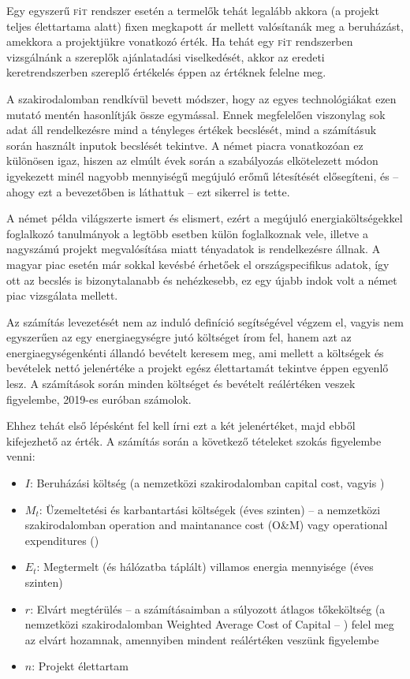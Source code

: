 \documentclass[twoside, magyar, showtrims]{corvinusphd}
\theoremstyle{plain}
\theoremstyle{remark}
\theoremstyle{definition}
\newcommand{\fit}{\textsc{f}i\textsc{t}\index{\textsc{f}i\textsc{t}} }
\begin{document}
Egy egyszerű \fit rendszer esetén a termelők tehát legalább akkora
(a projekt teljes élettartama alatt) fixen megkapott ár
mellett valósítanák meg a beruházást,
amekkora a projektjükre vonatkozó  érték.
Ha tehát egy \fit rendszerben vizsgálnánk
a szereplők ajánlatadási viselkedését,
akkor az eredeti keretrendszerben szereplő értékelés
éppen az  értéknek felelne meg.

A szakirodalomban rendkívül bevett módszer,
hogy az egyes technológiákat
ezen mutató mentén hasonlítják össze egymással.
Ennek megfelelően
viszonylag sok adat áll rendelkezésre mind a tényleges  értékek becslését,
mind a számításuk során használt inputok becslését tekintve.
A német piacra vonatkozóan ez különösen igaz,
hiszen az elmúlt évek során
a szabályozás elkötelezett módon igyekezett minél nagyobb
mennyiségű megújuló erőmű létesítését elősegíteni,
és -- ahogy ezt a bevezetőben is láthattuk -- ezt sikerrel is tette.

A német példa világszerte ismert és elismert,
ezért a megújuló energiaköltségekkel
foglalkozó tanulmányok a legtöbb esetben külön foglalkoznak vele,
illetve a nagyszámú projekt megvalósítása miatt tényadatok is rendelkezésre állnak.
A magyar piac esetén már sokkal kevésbé érhetőek el országspecifikus adatok,
így ott az  becslés is bizonytalanabb és nehézkesebb,
ez egy újabb indok volt a német piac vizsgálata mellett.

Az  számítás levezetését nem
az induló definíció segítségével végzem el,
vagyis nem egyszerűen az egy energiaegységre jutó
költséget írom fel, hanem azt az energiaegységenkénti állandó bevételt
keresem meg, ami mellett a költségek és bevételek nettó jelenértéke
a projekt egész élettartamát tekintve
éppen egyenlő lesz. A számítások során minden 
költséget és bevételt reálértéken veszek figyelembe,
2019-es euróban számolok.

Ehhez tehát első lépésként fel kell írni ezt a két jelenértéket,
majd ebből kifejezhető az  érték.
A számítás során a következő tételeket szokás figyelembe venni:

\begin{itemize}
    \item
        $I$: Beruházási költség (a nemzetközi szakirodalomban capital cost, vagyis )
    \item
   $M_t$: Üzemeltetési és karbantartási költségek (éves szinten) -- a nemzetközi szakirodalomban
operation and maintanance cost (O\&M) vagy operational expenditures ()
    \item
    $E_t$: Megtermelt (és hálózatba táplált) villamos energia mennyisége (éves szinten)
    \item
    $r$: Elvárt megtérülés -- a számításaimban a súlyozott átlagos tőkeköltség (a nemzetközi
szakirodalomban Weighted Average Cost of Capital – ) felel meg az elvárt hozamnak,
amennyiben mindent reálértéken veszünk figyelembe
    \item
    $n$: Projekt élettartam
\end{itemize}
\end{document}
